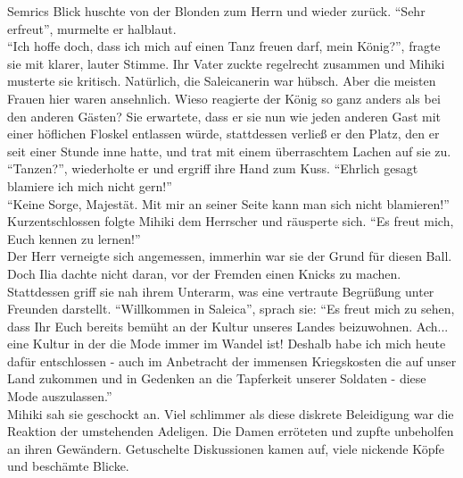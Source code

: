 Semrics Blick huschte von der Blonden zum Herrn und wieder zurück. ``Sehr erfreut'', murmelte 
er halblaut.\\
``Ich hoffe doch, dass ich mich auf einen Tanz freuen darf, mein König?'', fragte sie mit klarer, 
lauter Stimme. Ihr Vater zuckte regelrecht zusammen und Mihiki musterte sie kritisch. Natürlich, 
die Saleicanerin war hübsch. Aber die meisten Frauen hier waren ansehnlich. Wieso reagierte der 
König so ganz anders als bei den anderen Gästen? Sie erwartete, dass er sie nun wie jeden anderen 
Gast mit einer höflichen Floskel entlassen würde, stattdessen verließ er den Platz, den er 
seit einer Stunde inne hatte, und trat mit einem überraschtem Lachen auf sie zu.\\
``Tanzen?'', wiederholte er und ergriff ihre Hand zum Kuss. ``Ehrlich gesagt blamiere ich mich 
nicht gern!''\\
``Keine Sorge, Majestät. Mit mir an seiner Seite kann man sich nicht blamieren!''\\
Kurzentschlossen folgte Mihiki dem Herrscher und räusperte sich. ``Es freut mich, Euch kennen zu 
lernen!''\\
Der Herr verneigte sich angemessen, immerhin war sie der Grund für diesen Ball. Doch Ilia dachte 
nicht daran, vor der Fremden einen Knicks zu machen. Stattdessen griff sie nah ihrem Unterarm, was 
eine vertraute Begrüßung unter Freunden darstellt. ``Willkommen in Saleica'', sprach sie: ``Es 
freut mich zu sehen, dass Ihr Euch bereits bemüht an der Kultur unseres Landes beizuwohnen. Ach... 
eine Kultur in der die Mode immer im Wandel ist! Deshalb habe ich mich heute dafür entschlossen - 
auch im Anbetracht der immensen Kriegskosten die auf unser Land zukommen und in Gedenken an die 
Tapferkeit unserer Soldaten - diese Mode auszulassen.''\\
Mihiki sah sie geschockt an. Viel schlimmer als diese diskrete Beleidigung war die Reaktion der 
umstehenden Adeligen. Die Damen erröteten und zupfte unbeholfen an ihren Gewändern. Getuschelte 
Diskussionen kamen auf, viele nickende Köpfe und beschämte Blicke.\\

